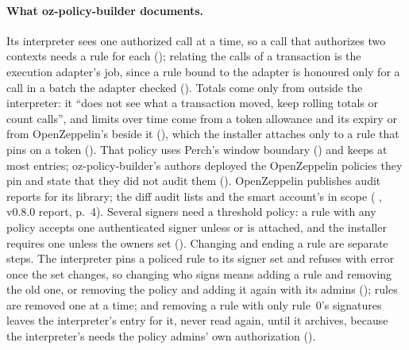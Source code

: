 \paragraph{What oz-policy-builder documents.} Its interpreter sees one authorized call at a
time, so a call that authorizes two contexts needs a rule for each
(); relating the calls of a transaction is the
execution adapter's job, since a rule bound to the adapter is honoured only for a
call in a batch the adapter checked (). Totals come
only from outside the interpreter: it ``does not see what a transaction moved,
keep rolling totals or count calls'', and limits over time come from a token
allowance and its expiry or from OpenZeppelin's  beside it
(), which the installer attaches only to a rule that
pins  on a token ().
That policy uses Perch's window boundary () and keeps at
most  entries; oz-policy-builder's authors deployed
the OpenZeppelin policies they pin and state that they did not audit them
(). OpenZeppelin publishes audit reports for
its library; the  diff audit lists 
and the smart account's  in scope (
, v0.8.0 report, p.~4). Several signers need a threshold policy: a
rule with any policy accepts one authenticated signer unless
 or  is attached, and the
installer requires one unless the owners set 
(). Changing and ending a rule are separate steps. The
interpreter pins a policed rule to its signer set and refuses with error
 once the set changes, so changing who signs means
adding a rule and removing the old one, or removing the policy and adding it
again with its admins (); rules are removed one at a time; and
removing a rule with only rule~0's signatures leaves the interpreter's entry for
it, never read again, until it archives, because the interpreter's
 needs the policy admins' own authorization
().

